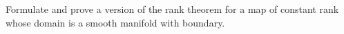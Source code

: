 Formulate and prove a version of the rank theorem for a map of constant rank whose domain is a smooth manifold with boundary.